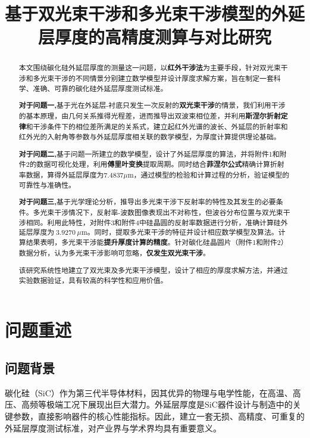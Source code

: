 \documentclass[withoutpreface,bwprint]{cumcmthesis}
\title{基于双光束干涉和多光束干涉模型的外延层厚度的高精度测算与对比研究}  %
\begin{document}
\maketitle

\begin{abstract}
本文围绕碳化硅外延层厚度的测量这一问题，以\textbf{红外干涉法}为主要手段，针对双光束干涉和多光束干涉的不同情景分别建立数学模型并设计厚度求解方案，旨在制定一套科学、准确、可靠的碳化硅外延层厚度测试标准。


\textbf{对于问题一,}基于光在外延层-衬底只发生一次反射的\textbf{双光束干涉}的情景，我们利用干涉的基本原理，由几何关系推得光程差，进而推导出双波束相位差，并利用\textbf{斯涅尔折射定律}和干涉条件下的相位差所满足的关系式，建立起红外光谱的波长、外延层的折射率和红外光的入射角等参数与外延层厚度相关联的数学模型，为厚度计算提供理论基础。

\textbf{对于问题二,}基于问题一所建立的数学模型，设计了外延层厚度的算法，并将附件1和附件2的数据可视化处理，利用\textbf{傅里叶变换}提取周期。同时结合\textbf{菲涅尔公式}精确计算折射率数据，算得外延层厚度为7.4837$\mu\text{m}$，通过模型的检验和计算过程的分析，验证模型的可靠性与准确性。

\textbf{对于问题三,}基于光学理论分析，推导出多光束干涉下反射率的特性及其发生的必要条件。多光束干涉情况下，反射率-波数图像表现出不对称性，但波谷分布位置与双光束干涉相同。利用此特性，对附件3和附件4中硅晶圆的反射率数据进行分析，准确计算硅外延层厚度为$\ 3.9270\ \mu\text{m}$。同时，提取多光束干涉的特征并设计相应数学模型及算法。计算结果表明，多光束干涉能\textbf{提升厚度计算的精度}。针对碳化硅晶圆片（附件1和附件2）数据分析，认为多光束干涉影响可忽略，\textbf{仅发生双光束干涉}。

该研究系统性地建立了双光束及多光束干涉模型，设计了相应的厚度求解方法，并通过实验数据验证，具有较高的科学性和应用价值。


\end{abstract}

\section{问题重述}
\subsection{问题背景}
碳化硅（SiC）作为第三代半导体材料，因其优异的物理与电学性能，在高温、高压、高频等极端工况下展现出巨大潜力。外延层厚度是SiC器件设计与制造中的关键参数，直接影响器件的核心性能指标。因此，建立一套无损、高精度、可重复的外延层厚度测试标准，对产业界与学术界均具有重要意义。
\end{document}
